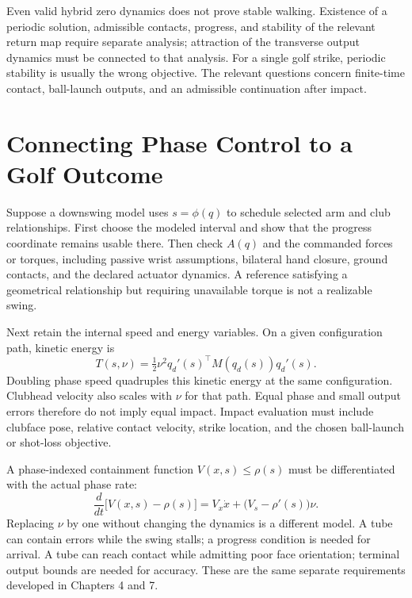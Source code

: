 \documentclass[12pt, openany]{book}
\theoremstyle{plain}
\begin{document}
Even valid hybrid zero dynamics does not prove stable walking. Existence of a periodic solution, admissible contacts, progress, and stability of the relevant return map require separate analysis; attraction of the transverse output dynamics must be connected to that analysis. For a single golf strike, periodic stability is usually the wrong objective. The relevant questions concern finite-time contact, ball-launch outputs, and an admissible continuation after impact.

\section{Connecting Phase Control to a Golf Outcome}

Suppose a downswing model uses $s=\phi(q)$ to schedule selected arm and club relationships. First choose the modeled interval and show that the progress coordinate remains usable there. Then check $A(q)$ and the commanded forces or torques, including passive wrist assumptions, bilateral hand closure, ground contacts, and the declared actuator dynamics. A reference satisfying a geometrical relationship but requiring unavailable torque is not a realizable swing.

Next retain the internal speed and energy variables. On a given configuration path, kinetic energy is
\begin{equation}
T(s,\nu)=\tfrac12\nu^2 q_d'(s)^\top M(q_d(s))q_d'(s).
\end{equation}
Doubling phase speed quadruples this kinetic energy at the same configuration. Clubhead velocity also scales with $\nu$ for that path. Equal phase and small output errors therefore do not imply equal impact. Impact evaluation must include clubface pose, relative contact velocity, strike location, and the chosen ball-launch or shot-loss objective.

A phase-indexed containment function $V(x,s)\leq\rho(s)$ must be differentiated with the actual phase rate:
\begin{equation}
\frac{d}{dt}\bigl[V(x,s)-\rho(s)\bigr]
=V_x\dot x+\bigl(V_s-\rho'(s)\bigr)\nu .
\end{equation}
Replacing $\nu$ by one without changing the dynamics is a different model. A tube can contain errors while the swing stalls; a progress condition is needed for arrival. A tube can reach contact while admitting poor face orientation; terminal output bounds are needed for accuracy. These are the same separate requirements developed in Chapters 4 and 7.
\end{document}
